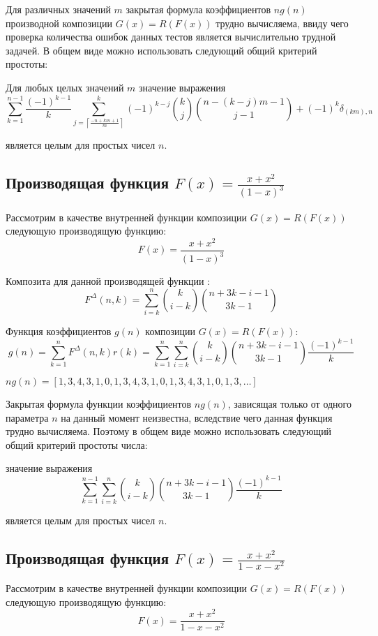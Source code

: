 \documentclass[
russian,
cp1251,
14pt,
simple
]{eskdtext}
\theoremstyle{definition}
\begin{document}
Для различных значений $m$ закрытая формула коэффициентов $ng(n)$ производной композиции $G(x)=R(F(x))$ трудно вычисляема, ввиду чего проверка количества ошибок данных тестов является вычислительно трудной задачей. В общем виде можно использовать следующий общий критерий простоты:

Для любых целых значений $m$ значение выражения
$$
\sum\limits _{k=1}^{n-1} \frac{(-1)^{k-1}}{k} \sum\limits _{j=\left\lceil\frac{-n + km + 1}{m}\right\rceil}^{k} (-1)^{k - j}{k \choose j}{n - (k - j)m - 1 \choose j - 1} + (-1)^k \delta_{\left(km\right),n}
$$

является целым для простых чисел $n$.

\subsection{Производящая функция $F(x)=\frac{x+x^2}{(1-x)^3}$}
Рассмотрим в качестве внутренней функции композиции $G(x)=R(F(x))$ следующую производящую функцию:
$$
F(x)=\frac{x+x^2}{(1-x)^3}
$$

Композита для данной производящей функции \cite{KruchininVV}:
$$
F^\Delta(n,k)=\sum_{i=k}^{n}{{k \choose i-k} {n+3k-i-1 \choose 3k-1}}
$$

Функция коэффициентов $g(n)$ композиции $G(x)=R(F(x))$:
$$
g(n)=\sum^{n}_{k=1}{F^\Delta(n,k)r(k)}=
\sum_{k=1}^{n}{\sum_{i=k}^{n}{{k \choose i-k} {n+3k-i-1 \choose 3k-1}} \frac{(-1)^{k-1}}{k}}
$$

\begin{math}
ng(n)=[1,3,4,3,1,0,1,3,4,3,1,0,1,3,4,3,1,0,1,3,\ldots]
\end{math}

Закрытая формула функции коэффициентов $ng(n)$, зависящая только от одного параметра $n$ на данный момент неизвестна, вследствие чего данная функция трудно вычисляема. Поэтому в общем виде можно использовать следующий общий критерий простоты числа:

значение выражения
$$
\sum_{k=1}^{n-1}{\sum_{i=k}^{n}{{k \choose i-k} {n+3k-i-1 \choose 3k-1}} \frac{(-1)^{k-1}}{k}}
$$

является целым для простых чисел $n$.

\subsection{Производящая функция $F(x)=\frac{x+x^2}{1-x-x^2}$}
Рассмотрим в качестве внутренней функции композиции $G(x)=R(F(x))$ следующую производящую функцию:
$$
F(x)=\frac{x+x^2}{1-x-x^2}
$$
\end{document}
